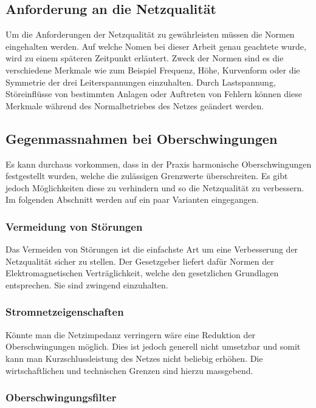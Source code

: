 \subsection{Anforderung an die Netzqualität}

Um die Anforderungen der Netzqualität zu gewährleisten müssen die Normen eingehalten werden. Auf welche Nomen bei dieser Arbeit genau geachtete wurde, wird zu einem späteren Zeitpunkt erläutert. Zweck der Normen sind es  die verschiedene Merkmale wie zum Beispiel Frequenz, Höhe, Kurvenform oder die Symmetrie der drei Leiterspannungen einzuhalten. Durch Lastspannung, Störeinflüsse von bestimmten Anlagen oder Auftreten von Fehlern können diese Merkmale während des Normalbetriebes des Netzes geändert werden. 


\subsection{Gegenmassnahmen bei Oberschwingungen}

Es kann durchaus vorkommen, dass in der Praxis harmonische Oberschwingungen festgestellt wurden, welche die zulässigen Grenzwerte überschreiten. Es gibt jedoch Möglichkeiten diese zu verhindern und so die Netzqualität zu verbessern. Im folgenden Abschnitt werden auf ein paar Varianten eingegangen.

\subsubsection{Vermeidung von Störungen}
Das Vermeiden von Störungen ist die einfachste Art um eine Verbesserung der Netzqualität sicher zu stellen. Der Gesetzgeber liefert dafür Normen der Elektromagnetischen Verträglichkeit, welche den gesetzlichen Grundlagen entsprechen. Sie sind zwingend einzuhalten.
\subsubsection{Stromnetzeigenschaften}
Könnte man die Netzimpedanz verringern wäre eine Reduktion der Oberschwingungen möglich. Dies ist jedoch generell nicht umsetzbar und somit kann man Kurzschlussleistung des Netzes nicht beliebig erhöhen. Die wirtschaftlichen und technischen Grenzen sind hierzu massgebend.  


\subsubsection{Oberschwingungsfilter}

